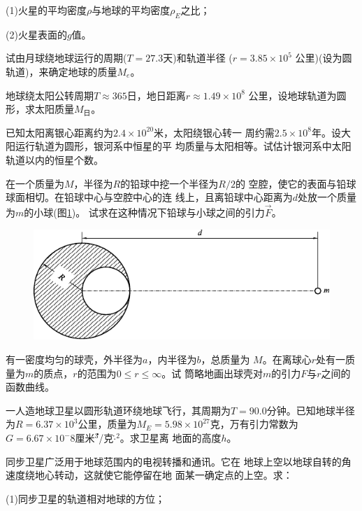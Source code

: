 \begin{exercises}
(1)火星的平均密度$\rho$与地球的平均密度$ \rho _ E $之比；

(2)火星表面的$ g $值。

\exercise 试由月球绕地球运行的周期($ T = 2 7 . 3 $天)和轨道半径
($ r = 3 . 8 5 \times 1 0 ^ { 5 } $ 公里)(设为圆轨道)，来确定地球的质量$ M _ e $。

\exercise 地球绕太阳公转周期$ T \approx 3 6 5 $日，地日距离$ r \approx 1 . 4 9 \times 1 0 ^ { 8 } $
公里，设地球轨道为圆形，求太阳质量$ M _ \text{日} $。

\exercise 已知太阳离银心距离约为$ 2 . 4 \times 1 0 ^ { 2 0 } $米，太阳绕银心转一
周约需$ 2 . 5 \times 1 0 ^ { 8 } $年。设大阳运行轨道为圆形，银河系中恒星的平
均质量与太阳相等。试估计银河系中太阳轨道以内的恒星个数。

\exercise 在一个质量为$ M $，半径为$ R $的铅球中挖一个半径为$ R/2 $的
空腔，使它的表面与铅球球面相切。在铅球中心与空腔中心的连
线上，且离铅球中心距离为$ d $处放一个质量为$ m $的小球(图\ref{fig:04.12})。
试求在这种情况下铅球与小球之间的引力$ \vec{F} $。
\begin{figure}[h]
  \centering
  \includegraphics{figure/fig04.12}
  \caption{}
  \label{fig:04.12}
\end{figure}

\exercise 有一密度均匀的球壳，外半径为$ a $，内半径为$ b $，总质量为
$ M $。在离球心$ r $处有一质量为$ m $的质点，$ r $的范围为$ 0 \leqslant r \leqslant \infty $。试
筒略地画出球壳对$ m $的引力$ F $与$ r $之间的函数曲线。

\exercise 一人造地球卫星以圆形轨道环绕地球飞行，其周期为$ T =
  90.0 $分钟。已知地球半径为$ R = 6. 3 7 \times 1 0 ^ { 3 } $公里，质量为$ M _ { E } = 5 . 9 8
  \times 1 0 ^ { 2 7 } $克，万有引力常数为$ G = 6 . 6 7 \times 1 0 ^ { - } 8 $厘米\.$ ^3 $/克$ \cdot $\.$ ^2 $。求卫星离
地面的高度$ h $。

\exercise 同步卫星广泛用于地球范围内的电视转播和通讯。它在
地球上空以地球自转的角速度绕地心转动，这就使它能停留在地
面某一确定点的上空。求：

(1)同步卫星的轨道相对地球的方位；


\end{exercises}

